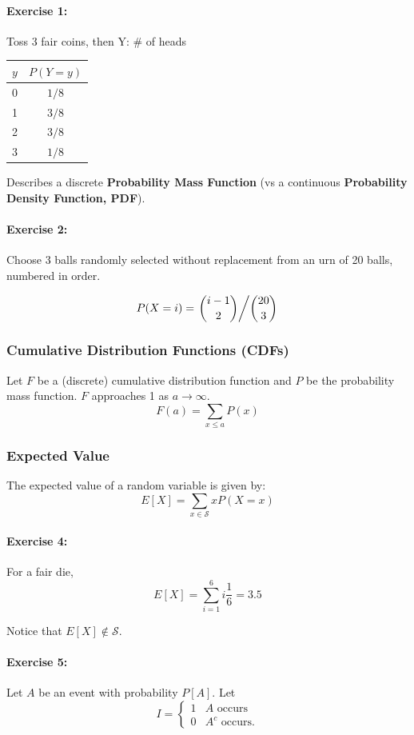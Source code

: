 \documentclass[12pt]{article}
\begin{document}
\paragraph{Exercise 1:}
Toss 3 fair coins, then Y: \# of heads

\begin{tabular}{ c | c }
$y$ & $P(Y=y)$\\
\hline
0 & ${1}/{8}$ \\ 
1 & ${3}/{8}$ \\ 
2 & ${3}/{8}$ \\ 
3 & ${1}/{8}$ \\ 
\end{tabular}

Describes a discrete \textbf{Probability Mass Function} (vs a continuous \textbf{Probability Density Function, PDF}).

\paragraph{Exercise 2:}
Choose 3 balls randomly selected without replacement from an urn of 20 balls, numbered in order.

\[P(X = i) = \left.{\binom{i-1}{2}} \middle/ {\binom{20}{3}}\right. \]

\subsubsection{Cumulative Distribution Functions (CDFs)}
Let $F$ be a (discrete) cumulative distribution function and $P$ be the probability mass function. $F$ approaches 1 as $a \to \infty$.
\[F(a) = \sum_{x\le a}P(x)\]

\subsubsection{Expected Value}
The expected value of a random variable is given by:
\[
E[X] = \sum_{x\in \mathcal{S}} x P(X = x)
\]

\paragraph{Exercise 4:}
For a fair die,
\[E[X] = \sum_{i=1}^6 i\frac{1}{6}=3.5\]

Notice that $E[X] \not\in \mathcal{S}$.

\paragraph{Exercise 5:}
Let $A$ be an event with probability $P[A]$. Let
\[
I = \begin{cases}
    1 & A \text{ occurs}\\
    0 & A^c \text{ occurs}.
\end{cases}
\]
\end{document}
